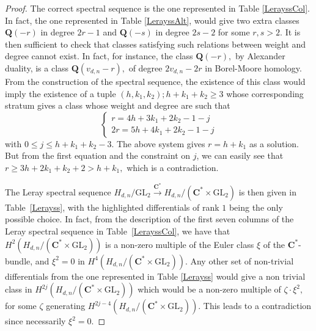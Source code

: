 \documentclass[10pt,a4paper,twoside]{amsart}
\theoremstyle{plain}
\theoremstyle{definition}
\theoremstyle{remark}
\begin{document}
\begin{proof}
The correct spectral sequence is the one represented in Table \ref{LerayssCol}. In fact, the one represented in Table \ref{LerayssAlt}, would give two extra classes $\mathbf{Q}(-r)$ in degree $2r-1$ and $\mathbf{Q}(-s)$ in degree $2s-2$ for some $r,s>2$. It is then sufficient to check that classes satisfying such relations between weight and degree cannot exist. In fact, for instance, the class $\mathbf{Q}(-r),$ by Alexander duality, is a class $\mathbf{Q}(v_{d,n}-r),$ of degree $2v_{d,n}-2r$ in Borel-Moore homology. From the construction of the spectral sequence, the existence of this class would imply the existence of a tuple $(h,k_1,k_2); h+k_1+k_2\geq 3$ whose corresponding stratum gives a class whose weight and degree are such that 
\begin{equation*}
\begin{cases}
    r=4h+3k_1+2k_2-1-j\\
    2r=5h+4k_1+2k_2-1-j
\end{cases}
\end{equation*}
with $0\leq j\leq h+k_1+k_2-3$. The above system gives $r=h+k_1$ as a solution. But from the first equation and the constraint on $j$, we can easily see that $r\geq 3h+2k_1+k_2+2>h+k_1,$ which is a contradiction. 

The Leray spectral sequence $H_{d,n}/\mathrm{GL}_2\xrightarrow{\mathbf{C}^*}H_{d,n}/(\mathbf{C}^*\times \mathrm{GL}_2)$ 
is then given in Table~\ref{Lerayss},  
with the highlighted differentials of rank $1$ being the only possible choice.
In fact, from the description of the first seven columns of the Leray spectral sequence in Table~\ref{LerayssCol}, we have that $H^2(H_{d,n}/(\mathbf{C}^*\times \mathrm{GL}_2))$ is a non-zero multiple of the Euler class $\xi$ of the $\mathbf{C}^*\mbox{-}$bundle, and $\xi^2=0$ in $H^4(H_{d,n}/(\mathbf{C}^*\times \mathrm{GL}_2))$. Any other set of non-trivial differentials 
from the one represented in Table \ref{Lerayss} would give a non trivial class in $H^{2j}(H_{d,n}/(\mathbf{C}^*\times \mathrm{GL}_2))$ which would be a non-zero multiple of $\zeta\cdot\xi^2,$ for some $\zeta$ generating $H^{2j-4}(H_{d,n}/(\mathbf{C}^*\times \mathrm{GL}_2))$.  This leads to a contradiction since necessarily $\xi^2=0$. 
\end{proof}
\end{document}
